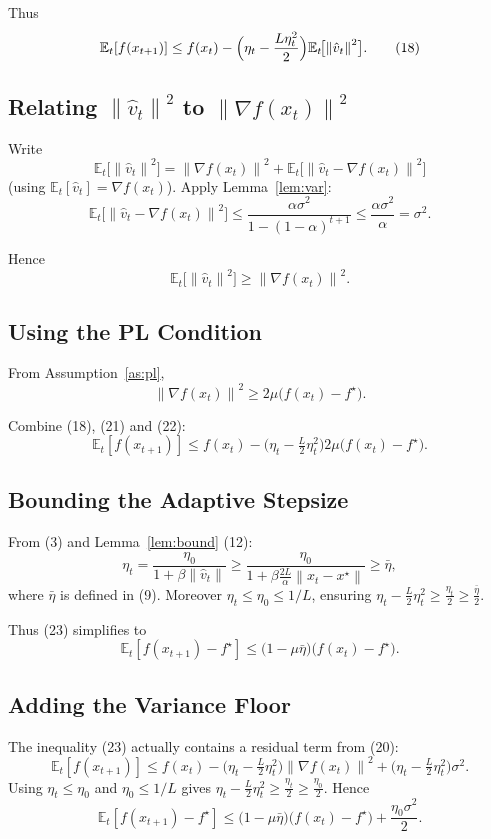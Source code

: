 \documentclass{article}
\newcommand{\E}{\mathbb{E}}
\newcommand{\norm}[1]{\left\|#1\right\|}
\begin{document}
Thus
\[
\E_{t}[f(x_{t+1})]\le f(x_{t})-\Bigl(\eta_{t}-\frac{L\eta_{t}^{2}}{2}\Bigr)\E_{t}\!\bigl[\norm{\hat v_{t}}^{2}\bigr].
\tag{18}
\]

\subsection*{Relating $\norm{\hat v_{t}}^{2}$ to $\norm{\nabla f(x_{t})}^{2}$}
Write
\[
\E_{t}\!\bigl[\norm{\hat v_{t}}^{2}\bigr]
= \norm{\nabla f(x_{t})}^{2}
+\E_{t}\!\bigl[\norm{\hat v_{t}-\nabla f(x_{t})}^{2}\bigr]
\tag{19}
\]
(using $\E_{t}[\hat v_{t}]=\nabla f(x_{t})$). Apply Lemma~\ref{lem:var}:
\[
\E_{t}\!\bigl[\norm{\hat v_{t}-\nabla f(x_{t})}^{2}\bigr]\le
\frac{\alpha\sigma^{2}}{1-(1-\alpha)^{t+1}}
\le \frac{\alpha\sigma^{2}}{\alpha}= \sigma^{2}.
\tag{20}
\]

Hence
\[
\E_{t}\!\bigl[\norm{\hat v_{t}}^{2}\bigr]\ge \norm{\nabla f(x_{t})}^{2}.
\tag{21}
\]

\subsection*{Using the PL Condition}
From Assumption~\ref{as:pl},
\[
\norm{\nabla f(x_{t})}^{2}\ge 2\mu\bigl(f(x_{t})-f^{\star}\bigr).
\tag{22}
\]

Combine (18), (21) and (22):
\[
\E_{t}[f(x_{t+1})]
\le f(x_{t})-\bigl(\eta_{t}-\tfrac{L}{2}\eta_{t}^{2}\bigr)2\mu\bigl(f(x_{t})-f^{\star}\bigr).
\tag{23}
\]

\subsection*{Bounding the Adaptive Stepsize}
From (3) and Lemma~\ref{lem:bound} (12):
\[
\eta_{t}= \frac{\eta_{0}}{1+\beta\norm{\hat v_{t}}}
\ge \frac{\eta_{0}}{1+\beta\frac{2L}{\alpha}\norm{x_{t}-x^{\star}}}
\ge \bar\eta,
\tag{24}
\]
where $\bar\eta$ is defined in (9). Moreover $\eta_{t}\le\eta_{0}\le 1/L$, ensuring
$\eta_{t}-\frac{L}{2}\eta_{t}^{2}\ge \frac{\eta_{t}}{2}\ge \frac{\bar\eta}{2}$.

Thus (23) simplifies to
\[
\E_{t}[f(x_{t+1})-f^{\star}]
\le \bigl(1-\mu\bar\eta\bigr)\bigl(f(x_{t})-f^{\star}\bigr).
\tag{25}
\]

\subsection*{Adding the Variance Floor}
The inequality (23) actually contains a residual term from (20):
\[
\E_{t}[f(x_{t+1})]\le f(x_{t})-
\bigl(\eta_{t}-\tfrac{L}{2}\eta_{t}^{2}\bigr)\norm{\nabla f(x_{t})}^{2}
+\bigl(\eta_{t}-\tfrac{L}{2}\eta_{t}^{2}\bigr)\sigma^{2}.
\tag{26}
\]
Using $\eta_{t}\le\eta_{0}$ and $\eta_{0}\le 1/L$ gives $\eta_{t}-\frac{L}{2}\eta_{t}^{2}\ge \frac{\eta_{t}}{2}\ge \frac{\eta_{0}}{2}$. Hence
\[
\E_{t}[f(x_{t+1})-f^{\star}]
\le \bigl(1-\mu\bar\eta\bigr)\bigl(f(x_{t})-f^{\star}\bigr)
+\frac{\eta_{0}\sigma^{2}}{2}.
\tag{27}
\]
\end{document}
